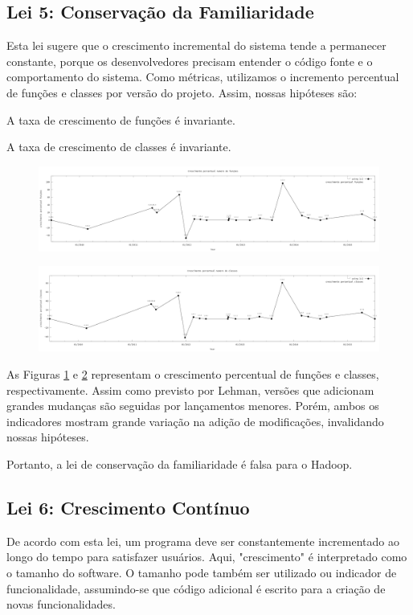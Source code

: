 \subsection{Lei 5: Conservação da Familiaridade}
Esta lei sugere que o crescimento incremental do sistema tende a permanecer constante, porque os desenvolvedores precisam entender o código fonte e o comportamento do sistema. Como métricas, utilizamos o incremento percentual de funções e classes por versão do projeto. Assim, nossas hipóteses são:

\begin{hypothesis}
	A taxa de crescimento de funções é invariante.
\end{hypothesis}
\begin{hypothesis}
	A taxa de crescimento de classes é invariante.
\end{hypothesis}
\begin{figure}[h]
	\centering
	\includegraphics[width=0.7\linewidth]{figure/crescimento_percentual_funcoes}
	\caption{}
	\label{fig:crescimentopercentualfuncoes}
\end{figure}
\begin{figure}[h]
	\centering
	\includegraphics[width=0.7\linewidth]{figure/crescimento_percentual_classes}
	\caption{}
	\label{fig:crescimentopercentualclasses}
\end{figure}

As Figuras \ref{fig:crescimentopercentualfuncoes} e \ref{fig:crescimentopercentualclasses} representam o crescimento percentual de funções e classes, respectivamente. Assim como previsto por Lehman\cite{lehman1996laws}, versões que adicionam grandes mudanças são seguidas por lançamentos menores. Porém, ambos os indicadores mostram grande variação na adição de modificações, invalidando nossas hipóteses.

Portanto, a lei de conservação da familiaridade é falsa para o Hadoop.
\subsection{Lei 6: Crescimento Contínuo}
De acordo com esta lei, um programa deve ser constantemente incrementado ao longo do tempo para satisfazer usuários. Aqui, "crescimento" é interpretado como o tamanho do software. O tamanho pode também ser utilizado ou indicador de funcionalidade, assumindo-se que código adicional é escrito para a criação de novas funcionalidades.

